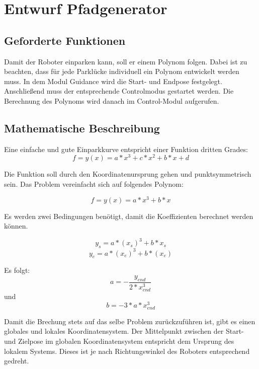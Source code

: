 \chapter{Entwurf Pfadgenerator}

\section{Geforderte Funktionen}

Damit der Roboter einparken kann, soll er einem Polynom folgen. Dabei ist zu beachten, dass für jede Parklücke individuell ein Polynom entwickelt werden muss. In dem Modul Guidance wird die Start- und Endpose festgelegt. Anschließend muss der entsprechende Controlmodus gestartet werden. Die Berechnung des Polynoms wird danach im Control-Modul aufgerufen. 


\section{Mathematische Beschreibung}

Eine einfache und gute Einparkkurve entspricht einer Funktion dritten Grades:
\begin{equation}
f=y(x)=a*x^3+c*x^2+b*x+d
\end{equation}

\noindent Die Funktion soll durch den Koordinatenursprung gehen und punktsymmetrisch sein. Das Problem vereinfacht sich auf folgendes Polynom:

\begin{equation}
f=y(x)=a*x^3+b*x
\end{equation}

\noindent Es werden zwei Bedingungen benötigt, damit die Koeffizienten berechnet werden können. 

\begin{equation}
 y_s=a*(x_s)^3+b*x_s
 \end{equation}
 \begin{equation}
y_e=a*(x_e)^3+b*(x_e)
 \end{equation}
 
\noindent Es folgt:
 \begin{equation}
a=-\dfrac{y_{end}}{2*x_{end}^3}
\end{equation}
\noindent und
 \begin{equation} 
b=-3*a*x_{end}^3
\end{equation}

\noindent Damit die Brechung stets auf das selbe Problem zurückzuführen ist, gibt es einen globales und lokales Koordinatensystem. Der Mittelpunkt zwischen der Start- und Zielpose im globalen Koordinatensystem entspricht dem Ursprung des lokalem Systems. Dieses ist je nach Richtungswinkel des Roboters entsprechend gedreht.
   

